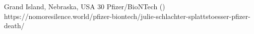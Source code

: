           {Grand Island, Nebraska, USA}
          {30}
          {Pfizer/BioNTech}
          {}
          {
             ()
          }
          {https://nomoresilence.world/pfizer-biontech/julie-schlachter-splattstoesser-pfizer-death/}


